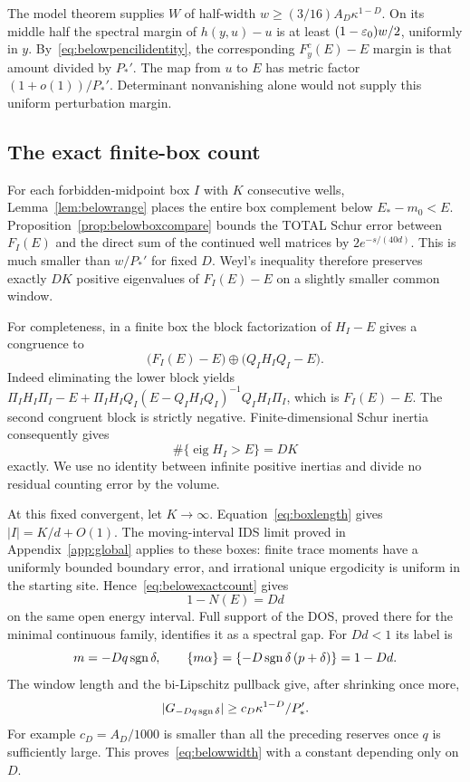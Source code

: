 The model theorem supplies $W$ of half-width
$w\ge(3/16)A_D\kappa^{1-D}$. On its middle half the spectral margin of $h(y,u)-u$ is at least $(1-\varepsilon_0)w/2$, uniformly in $y$. By~\eqref{eq:belowpencilidentity}, the corresponding $F_y^c(E)-E$ margin is that amount divided by $P_*'$. The map from $u$ to $E$ has metric factor $(1+o(1))/P_*'$. Determinant nonvanishing alone would not supply this uniform perturbation margin.

\subsection{The exact finite-box count}
For each forbidden-midpoint box $I$ with $K$ consecutive wells, Lemma~\ref{lem:belowrange} places the entire box complement below $E_*-m_0<E$. Proposition~\ref{prop:belowboxcompare} bounds the TOTAL Schur error between $F_I(E)$ and the direct sum of the continued well matrices by
$2e^{-s/(40d)}$. This is much smaller than $w/P_*'$ for fixed $D$. Weyl's inequality therefore preserves exactly $DK$ positive eigenvalues of $F_I(E)-E$ on a slightly smaller common window.

For completeness, in a finite box the block factorization of $H_I-E$ gives a congruence to
\[
 \bigl(F_I(E)-E\bigr)\oplus\bigl(Q_IH_IQ_I-E\bigr).
\]
Indeed eliminating the lower block yields
$\Pi_IH_I\Pi_I-E+
 \Pi_IH_IQ_I(E-Q_IH_IQ_I)^{-1}Q_IH_I\Pi_I$,
which is $F_I(E)-E$. The second congruent block is strictly negative.
Finite-dimensional Schur inertia consequently gives
\begin{equation}\label{eq:belowexactcount}
 \#\{\operatorname{eig}H_I>E\}=DK
\end{equation}
exactly. We use no identity between infinite positive inertias and divide no residual counting error by the volume.

At this fixed convergent, let $K\to\infty$. Equation~\eqref{eq:boxlength} gives $|I|=K/d+O(1)$. The moving-interval IDS limit proved in Appendix~\ref{app:global} applies to these boxes: finite trace moments have a uniformly bounded boundary error, and irrational unique ergodicity is uniform in the starting site. Hence~\eqref{eq:belowexactcount} gives
\[
 1-N(E)=Dd
\]
on the same open energy interval. Full support of the DOS, proved there for the minimal continuous family, identifies it as a spectral gap. For $Dd<1$ its label is
\[
 m=-Dq\operatorname{sgn}\delta,\qquad
 \{m\alpha\}=\{-D\operatorname{sgn}\delta\,(p+\delta)\}=1-Dd.
\]
The window length and the bi-Lipschitz pullback give, after shrinking once more,
\[
 |G_{-Dq\operatorname{sgn}\delta}|\ge c_D\kappa^{1-D}/P_*'.
\]
For example $c_D=A_D/1000$ is smaller than all the preceding reserves once $q$ is sufficiently large. This proves~\eqref{eq:belowwidth} with a constant depending only on $D$.

